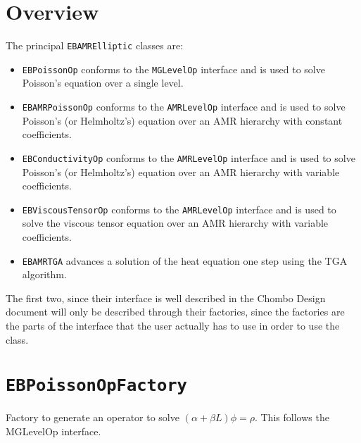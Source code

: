 \section{Overview}

The principal {\tt EBAMRElliptic} classes are:
\begin{itemize}
\item {\tt EBPoissonOp} conforms to the {\tt MGLevelOp} interface and
  is used to solve Poisson's equation over a single level.
\item {\tt EBAMRPoissonOp} conforms to the {\tt AMRLevelOp} interface and
  is used to solve Poisson's (or Helmholtz's) equation over an AMR hierarchy with
  constant coefficients.
\item {\tt EBConductivityOp} conforms to the {\tt AMRLevelOp} interface and
  is used to solve Poisson's (or Helmholtz's) equation over an AMR hierarchy with
  variable coefficients.
\item {\tt EBViscousTensorOp} conforms to the {\tt AMRLevelOp} interface and
  is used to solve the viscous tensor equation over an AMR hierarchy with
  variable coefficients.
\item {\tt EBAMRTGA} advances a solution of the heat equation one step
  using the TGA \cite{TGA} algorithm.
\end{itemize}
The first two, since their interface is well described in the Chombo
Design document \cite{ChomboDesign} will only be described through
their factories, since the factories are the parts of the interface
that the user actually has to use in order to use the class.

\section{{\tt EBPoissonOpFactory} }
   Factory to generate an operator to solve $(\alpha + \beta L)
   \phi = \rho$.   
This follows the MGLevelOp interface.

